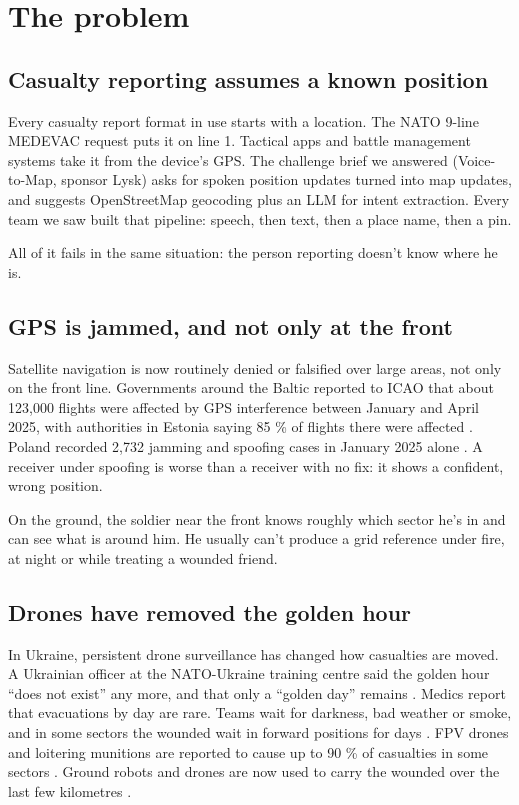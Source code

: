 \chapter{The problem}\label{ch:problem}

\section{Casualty reporting assumes a known position}

Every casualty report format in use starts with a location. The NATO 9-line MEDEVAC request
puts it on line 1. Tactical apps and battle management systems take it from the device's GPS.
The challenge brief we answered (Voice-to-Map, sponsor Lysk) asks for spoken position updates
turned into map updates, and suggests OpenStreetMap geocoding plus an LLM for intent
extraction. Every team we saw built that pipeline: speech, then text, then a place name, then a
pin.

All of it fails in the same situation: the person reporting doesn't know where he is.

\section{GPS is jammed, and not only at the front}

Satellite navigation is now routinely denied or falsified over large areas, not only on the
front line. Governments around the Baltic reported to ICAO that about 123,000 flights were
affected by GPS interference between January and April 2025, with authorities in Estonia saying
85 \% of flights there were affected \cite{gps123k,trtgps}. Poland recorded 2,732 jamming and
spoofing cases in January 2025 alone \cite{trtgps}. A receiver under spoofing is worse than a
receiver with no fix: it shows a confident, wrong position.

On the ground, the soldier near the front knows roughly which sector he's in and can see what
is around him. He usually can't produce a grid reference under fire, at night or while treating
a wounded friend.

\section{Drones have removed the golden hour}

In Ukraine, persistent drone surveillance has changed how casualties are moved. A Ukrainian
officer at the NATO-Ukraine training centre said the golden hour ``does not exist'' any more, and
that only a ``golden day'' remains \cite{goldenday}. Medics report that evacuations by day are
rare. Teams wait for darkness, bad weather or smoke, and in some sectors the wounded wait in
forward positions for days \cite{wotr,daylight}. FPV drones and loitering munitions are reported
to cause up to 90 \% of casualties in some sectors \cite{dignitas}. Ground robots and drones are
now used to carry the wounded over the last few kilometres \cite{aspi}.

